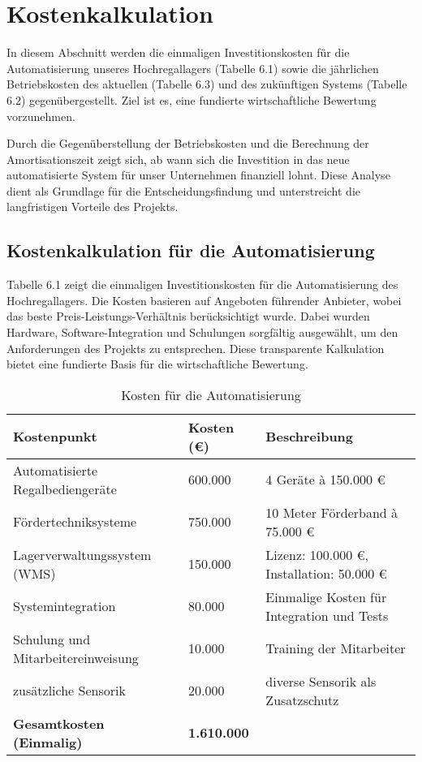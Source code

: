 \chapter{Kostenkalkulation}
In diesem Abschnitt werden die einmaligen Investitionskosten für die Automatisierung unseres Hochregallagers (Tabelle 6.1) sowie die jährlichen Betriebskosten des aktuellen (Tabelle 6.3) und des zukünftigen Systems (Tabelle 6.2) gegenübergestellt. Ziel ist es, eine fundierte wirtschaftliche Bewertung vorzunehmen.  

Durch die Gegenüberstellung der Betriebskosten und die Berechnung der Amortisationszeit zeigt sich, ab wann sich die Investition in das neue automatisierte System für unser Unternehmen finanziell lohnt. Diese Analyse dient als Grundlage für die Entscheidungsfindung und unterstreicht die langfristigen Vorteile des Projekts.  
\section{Kostenkalkulation für die Automatisierung}
Tabelle 6.1 zeigt die einmaligen Investitionskosten für die Automatisierung des Hochregallagers. Die Kosten basieren auf Angeboten führender Anbieter, wobei das beste Preis-Leistungs-Verhältnis berücksichtigt wurde. Dabei wurden Hardware, Software-Integration und Schulungen sorgfältig ausgewählt, um den Anforderungen des Projekts zu entsprechen. Diese transparente Kalkulation bietet eine fundierte Basis für die wirtschaftliche Bewertung.
\begin{table}[H]
	\centering
	\begin{tabular}{|p{8cm}|p{4cm}|p{5cm}|}
		\hline
		\textbf{Kostenpunkt} & \textbf{Kosten (€)} & \textbf{Beschreibung} \\
		\hline
		Automatisierte Regalbediengeräte & 600.000 & 4 Geräte à 150.000 € \\
		\hline
		Fördertechniksysteme & 750.000 & 10 Meter Förderband à 75.000 € \\
		\hline
		Lagerverwaltungssystem (WMS) & 150.000 & Lizenz: 100.000 €, Installation: 50.000 € \\
		\hline
		Systemintegration & 80.000 & Einmalige Kosten für Integration und Tests \\
		\hline
		Schulung und Mitarbeitereinweisung & 10.000 & Training der Mitarbeiter \\
		\hline
		zusätzliche Sensorik & 20.000 & diverse Sensorik als Zusatzschutz \\
		\hline
		\textbf{Gesamtkosten (Einmalig)} & \textbf{1.610.000} & \\
		\hline
	\end{tabular}
	\caption{Kosten für die Automatisierung}
\end{table}


